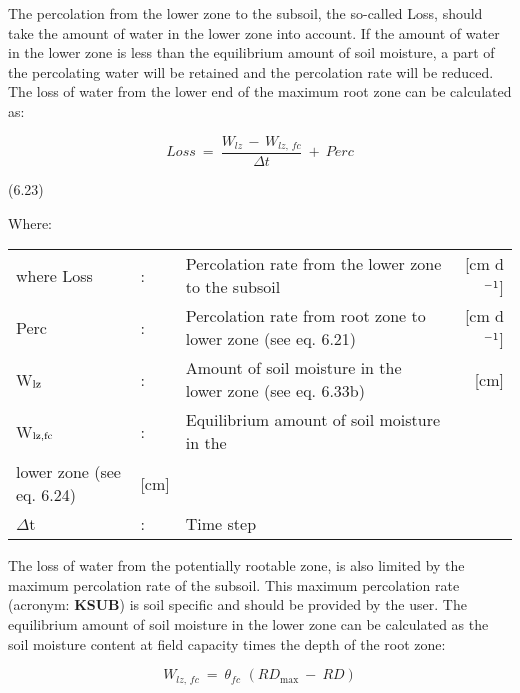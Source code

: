 The percolation from the lower zone to the subsoil, the so-called Loss, should take the
amount of water in the lower zone into account. If the amount of water in the lower zone
is less than the equilibrium amount of soil moisture, a part of the percolating water will
be retained and the percolation rate will be reduced. The loss of water from the lower end
of the maximum root zone can be calculated as:

\begin{equation}
Loss ~=~{\frac{W _{lz} \, -\, W _{lz,\, fc} }{\Delta t}} ~+~ Perc
\end{equation}

 
\strut\hfill (6.23)

Where:\\
\begin{tabularx}{\textwidth}{llXr}



where Loss &:& Percolation rate from the lower zone to the subsoil   & [cm d$^{{\rm -1}}$]\\
Perc &:& Percolation rate from root zone to lower zone (see eq. 6.21)  & [cm d$^{{\rm -1}}$]\\
W$_{{\rm lz}}$ &:& Amount of soil moisture in the lower zone (see eq. 6.33b)  & [cm]\\
W$_{{\rm lz,fc}}$ &:& Equilibrium amount of soil moisture in the\\
   lower zone (see eq. 6.24)  & [cm]\\
$\Delta$t &:& Time step   
\end{tabularx}


The loss of water from the potentially rootable zone, is also limited by the maximum
percolation rate of the subsoil. This maximum percolation rate (acronym: {\bf KSUB}) is soil
specific and should be provided by the user. The equilibrium amount of soil moisture in
the lower zone can be calculated as the soil moisture content at field capacity times the
depth of the root zone:

\begin{equation}
W _{lz,\, fc} ~=~ \theta  _{fc} \,\, (RD _{\max} ~-~RD)
\end{equation}

